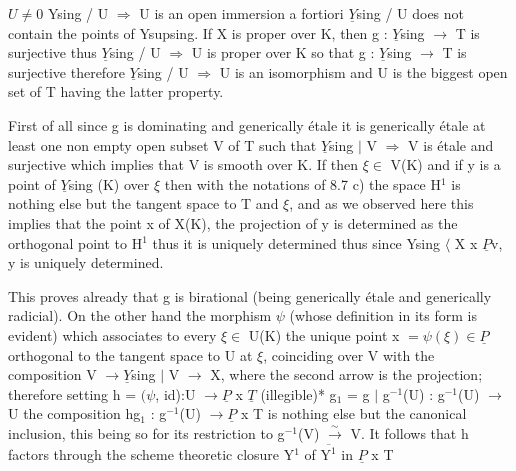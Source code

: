 
$U \neq 0$ Ysing / U $\Rightarrow$ U is an open immersion a fortiori $\underline{Y}$sing / U does 
not contain the points of Ysupsing.  If X is proper over K, then
g : $\underline{Y}$sing $\to$ T is surjective thus $\underline{Y}$sing / U $\Rightarrow$ U is proper over K so
that g : $\underline{Y}$sing $\to$ T is surjective therefore $\underline{Y}$sing / U $\Rightarrow$ U is an
isomorphism and U is the biggest open set of T having the latter 
property.

First of all since g is dominating and generically étale it
is generically étale at least one non empty open subset V of T
such that $\underline{Y}$sing $|$ V $\Rightarrow$ V is étale and surjective which implies that
V is smooth over K.  If then $\xi \in$ V(K) and if y is a point of $\underline{Y}$sing
(K) over $\xi$ then with the notations of 8.7 c) the space H$^1$ is
nothing else but the tangent space to T and $\xi$, and as we observed
here this implies that the point x of X(K), the projection of y is
determined as the orthogonal point to H$^1$ thus it is uniquely
determined thus since Ysing $\langle$ X x $\underline{P}$v, y is uniquely determined.

This proves already that g is birational (being generically
étale and generically radicial).  On the other hand the morphism $\psi$
(whose definition in its form is evident) which associates to
every $\xi \in$ U(K) the unique point x  $= \psi(\xi) \in \underline{P}$ orthogonal to the
tangent space to U at $\xi$, coinciding over V with the composition V
$\to \underline{Y}$sing $|$ V $\to$ X, where the second arrow is the projection;
therefore setting h = $(\psi$, id):U $\to \underline{P}$ x $\underline{T}$ (illegible)*
g$_1$ = g $|$ g$^{-1}$(U) : g$^{-1}$(U) $\to$ U the composition hg$_1$ : g$^{-1}$(U) $\to \underline{P}$ x T
is nothing else but the canonical inclusion, this being so for its
restriction to g$^{-1}$(V) $\xrightarrow{\sim}$ V.  It follows that h
factors through the scheme theoretic closure Y$^1$ of $\overline{\text{Y}^1}$ in $\underline{P}$ x T

